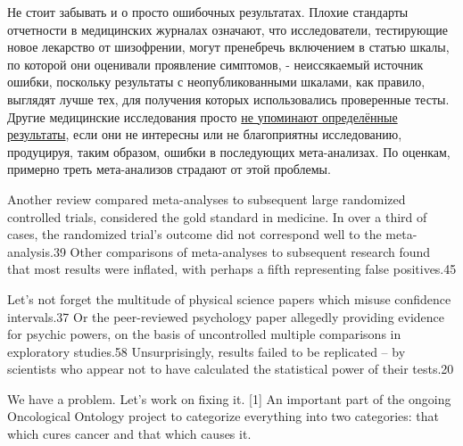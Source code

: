 Не стоит забывать и о просто ошибочных результатах. Плохие стандарты отчетности в медицинских журналах означают, что исследователи, тестирующие новое лекарство от шизофрении, могут пренебречь включением в статью шкалы, по которой они оценивали проявление симптомов, - неиссякаемый источник ошибки, поскольку результаты с неопубликованными шкалами, как правило, выглядят лучше тех, для получения которых использовались проверенные тесты. \cite{marshall_unpublished_2000} Другие медицинские исследования просто \hyperref[chp10:leaveoutdetails]{не упоминают определённые результаты}, если они не интересны или не благоприятны исследованию, продуцируя, таким образом, ошибки в последующих мета-анализах. По оценкам, примерно треть мета-анализов страдают от этой проблемы. \cite{kirkham_impact_2010}


Another review compared meta-analyses to subsequent large randomized controlled trials, considered the gold standard in medicine. In over a third of cases, the randomized trial’s outcome did not correspond well to the meta-analysis.39 Other comparisons of meta-analyses to subsequent research found that most results were inflated, with perhaps a fifth representing false positives.45

Let’s not forget the multitude of physical science papers which misuse confidence intervals.37 Or the peer-reviewed psychology paper allegedly providing evidence for psychic powers, on the basis of uncontrolled multiple comparisons in exploratory studies.58 Unsurprisingly, results failed to be replicated – by scientists who appear not to have calculated the statistical power of their tests.20

We have a problem. Let’s work on fixing it.
[1]	An important part of the ongoing Oncological Ontology project to categorize everything into two categories: that which cures cancer and that which causes it.